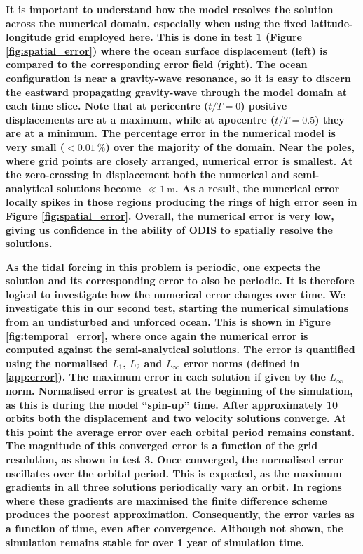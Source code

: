 \textbf{It is important to understand how the model resolves the solution across the numerical domain, especially when using the fixed latitude-longitude grid employed here. This is done in test 1 (Figure \ref{fig:spatial_error}) where the ocean surface displacement (left) is compared to the corresponding error field (right). The ocean configuration is near a gravity-wave resonance, so it is easy to discern the eastward propagating gravity-wave through the model domain at each time slice. Note that at pericentre ($t/T = 0$) positive displacements are at a maximum, while at apocentre ($t/T = 0.5$) they are at a minimum. The percentage error in the numerical model is very small ($< \SI{0.01}{\percent}$) over the majority of the domain. Near the poles, where grid points are closely arranged, numerical error is smallest. At the zero-crossing in displacement both the numerical and semi-analytical solutions become $\ll \SI{1}{\metre}$. As a result, the numerical error locally spikes in those regions producing the rings of high error seen in Figure \ref{fig:spatial_error}. Overall, the numerical error is very low, giving us confidence in the ability of ODIS to spatially resolve the solutions.}  

\textbf{As the tidal forcing in this problem is periodic, one expects the solution and its corresponding error to also be periodic. It is therefore logical to investigate how the numerical error changes over time. We investigate this in our second test, starting the numerical simulations from an undisturbed and unforced ocean. This is shown in Figure \ref{fig:temporal_error}, where once again the numerical error is computed against the \citet{matsuyama2014tidal} semi-analytical solutions. The error is quantified using the normalised $L_1$, $L_2$ and $L_{\infty}$ error norms (defined in \ref{app:error}). The maximum error in each solution if given by the $L_{\infty}$ norm. Normalised error is greatest at the beginning of the simulation, as this is during the model ``spin-up'' time. After approximately \num{10} orbits both the displacement and two velocity solutions converge. At this point the average error over each orbital period remains constant. The magnitude of this converged error is a function of the grid resolution, as shown in test 3. Once converged, the normalised error oscillates over the orbital period. This is expected, as the maximum gradients in all three solutions periodically vary an orbit. In regions where these gradients are maximised the finite difference scheme produces the poorest approximation. Consequently, the error varies as a function of time, even after convergence.  Although not shown, the simulation remains stable for over 1 year of simulation time. }

